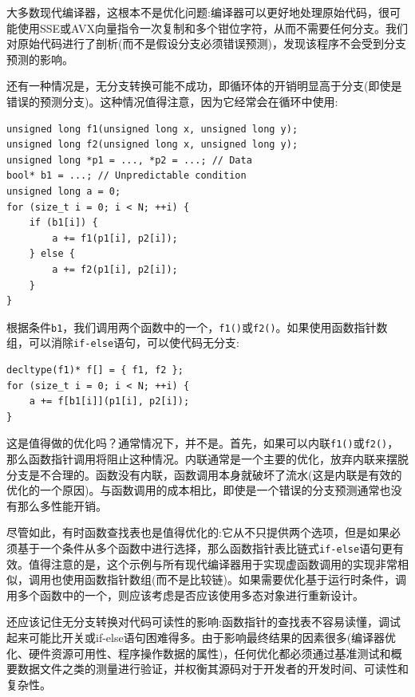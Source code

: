 大多数现代编译器，这根本不是优化问题:编译器可以更好地处理原始代码，很可能使用SSE或AVX向量指令一次复制和多个钳位字符，从而不需要任何分支。我们对原始代码进行了剖析(而不是假设分支必须错误预测)，发现该程序不会受到分支预测的影响。

还有一种情况是，无分支转换可能不成功，即循环体的开销明显高于分支(即使是错误的预测分支)。这种情况值得注意，因为它经常会在循环中使用:

\begin{lstlisting}[style=styleCXX]
unsigned long f1(unsigned long x, unsigned long y);
unsigned long f2(unsigned long x, unsigned long y);
unsigned long *p1 = ..., *p2 = ...; // Data
bool* b1 = ...; // Unpredictable condition
unsigned long a = 0;
for (size_t i = 0; i < N; ++i) {
	if (b1[i]) {
		a += f1(p1[i], p2[i]);
	} else {
		a += f2(p1[i], p2[i]);
	}
}
\end{lstlisting}

根据条件\texttt{b1}，我们调用两个函数中的一个，\texttt{f1()}或\texttt{f2()}。如果使用函数指针数组，可以消除\texttt{if-else}语句，可以使代码无分支:

\begin{lstlisting}[style=styleCXX]
decltype(f1)* f[] = { f1, f2 };
for (size_t i = 0; i < N; ++i) {
	a += f[b1[i]](p1[i], p2[i]);
}
\end{lstlisting}

这是值得做的优化吗？通常情况下，并不是。首先，如果可以内联\texttt{f1()}或\texttt{f2()}，那么函数指针调用将阻止这种情况。内联通常是一个主要的优化，放弃内联来摆脱分支是不合理的。函数没有内联，函数调用本身就破坏了流水(这是内联是有效的优化的一个原因)。与函数调用的成本相比，即使是一个错误的分支预测通常也没有那么多性能开销。

尽管如此，有时函数查找表也是值得优化的:它从不只提供两个选项，但是如果必须基于一个条件从多个函数中进行选择，那么函数指针表比链式\texttt{if-else}语句更有效。值得注意的是，这个示例与所有现代编译器用于实现虚函数调用的实现非常相似，调用也使用函数指针数组(而不是比较链)。如果需要优化基于运行时条件，调用多个函数中的一个，则应该考虑是否应该使用多态对象进行重新设计。

还应该记住无分支转换对代码可读性的影响:函数指针的查找表不容易读懂，调试起来可能比开关或if-else语句困难得多。由于影响最终结果的因素很多(编译器优化、硬件资源可用性、程序操作数据的属性)，任何优化都必须通过基准测试和概要数据文件之类的测量进行验证，并权衡其源码对于开发者的开发时间、可读性和复杂性。






